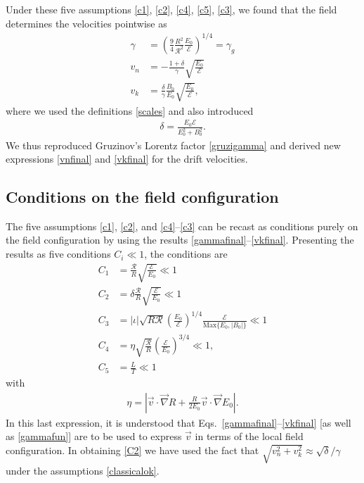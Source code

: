 \documentclass[amsmath,amssymb,nofootinbib,notitlepage,superscriptaddress,twocolumn]{revtex4-2}
\begin{document}
Under these five assumptions \eqref{c1}, \eqref{c2}, \eqref{c4}, \eqref{c5}, \eqref{c3}, we found that the field determines the velocities pointwise as
\begin{align}
    \gamma&=\left( \frac{9}{4}\frac{R^2}{\mathcal{R}^2}\frac{E_0}{\mathcal{E}} \right)^{1/4} = \gamma_g \label{gammafinal} \\
    v_n&=-\frac{1+\delta}{\gamma}\sqrt{\frac{E_0}{\mathcal{E}}} \label{vnfinal}\\
    v_k&=\frac{\delta}{\gamma}\frac{B_0}{E_0}\sqrt{\frac{E_0}{\mathcal{E}}},\label{vkfinal}
\end{align}
where we used the definitions \eqref{scales} and also introduced
\begin{align}\label{delta}
    \delta = \frac{E_0\mathcal{E}}{E_0^2+B_0^2}.
\end{align}
We thus reproduced Gruzinov's Lorentz factor \eqref{gruzigamma} and derived new expressions \eqref{vnfinal} and \eqref{vkfinal} for the drift velocities.

\subsection{Conditions on the field configuration}\label{sec:conditions}

The five assumptions \eqref{c1}, \eqref{c2}, and \eqref{c4}--\eqref{c3} can be recast as conditions purely on the field configuration by using the results \eqref{gammafinal}--\eqref{vkfinal}.  Presenting the results as five conditions $C_i\ll 1$, the conditions are
\begin{align}
    C_1 & = \frac{\mathcal{R}}{R} \sqrt{\frac{\mathcal{E}}{E_0}}  \ll 1 \label{C1} \\
    C_2 & = \delta \frac{\mathcal{R}}{R} \sqrt{\frac{\mathcal{E}}{E_0}} \ll 1 \label{C2} \\
    C_3 & = |\iota| \sqrt{R \mathcal{R}} \left(\frac{E_0}{\mathcal{E}}\right)^{1/4} \frac{\mathcal{E}}{\textrm{Max}\{E_0,|B_0|\}} \ll 1 \label{C3} \\
    C_4 & = \eta \sqrt{\frac{\mathcal{R}}{R}}\left(\frac{\mathcal{E}}{E_0}\right)^{3/4} \ll 1, \label{C4}\\
    C_5 &= \frac{L}{T} \ll 1 \label{C5}
\end{align}
with 
\begin{align}\label{eta}
   \eta = \left|\vec{v}\cdot \vec{\nabla} R +\frac{R}{2E_0}\vec{v}\cdot \vec{\nabla} E_0 \right|.
\end{align}
In this last expression, it is understood that Eqs.~\eqref{gammafinal}--\eqref{vkfinal} [as well as \eqref{gammafun}] are to be used to express $\vec{v}$ in terms of the local field configuration.  In obtaining \eqref{C2} we have used the fact that $\sqrt{v_n^2+v_k^2} \approx \sqrt{\delta}/\gamma$ under the assumptions \eqref{classicalok}.
\end{document}
